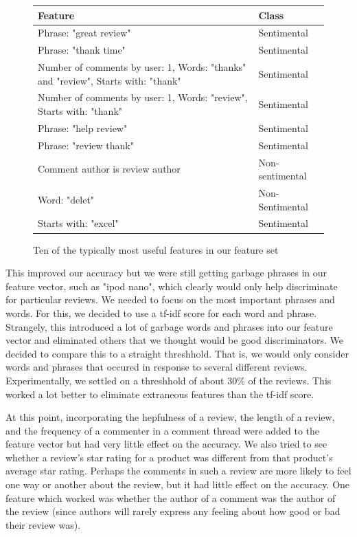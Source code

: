 \documentclass[]{report}
\begin{document}
\begin{figure}
	\begin{center}
	\begin{tabular}{ p{7 cm} | p{3 cm} }
			Feature& 
			Class     \\
			\hline
			\hline
			Phrase: "great review" & Sentimental  \\
			\hline
			Phrase: "thank time" & Sentimental  \\
			\hline
			Number of comments by user: 1, Words: "thanks" and "review", Starts with: "thank" & Sentimental \\
			\hline
			Number of comments by user: 1, Words: "review", Starts with: "thank" & Sentimental \\
			\hline
			Phrase: "help review" & Sentimental  \\
			\hline
			Phrase: "review thank" & Sentimental  \\
			\hline
			Comment author is review author & Non-sentimental  \\
			\hline
			Word: "delet" & Non-Sentimental  \\
			\hline
			Starts with: "excel" & Sentimental  \\
			\hline
		\end{tabular}
	\end{center}
	\caption{Ten of the typically most useful features in our feature set}
	\label{figBestFeatures}
\end{figure}


This improved our accuracy but we were still getting garbage phrases in our feature vector, such as "ipod nano", which clearly would only help discriminate for particular reviews.  We needed to focus on the most important phrases and words.  For this, we decided to use a tf-idf score for each word and phrase.  Strangely, this introduced a lot of garbage words and phrases into our feature vector and eliminated others that we thought would be good discriminators.  We decided to compare this to a straight threshhold.  That is, we would only consider words and phrases that occured in response to several different reviews.  Experimentally, we settled on a threshhold of about 30\% of the reviews.  This worked a lot better to eliminate extraneous features than the tf-idf score.

At this point, incorporating the hepfulness of a review, the length of a review, and the frequency of a commenter in a comment thread were added to the feature vector but had very little effect on the accuracy.  We also tried to see whether a review's star rating for a product was different from that product's average star rating.  Perhaps the comments in such a review are more likely to feel one way or another about the review, but it had little effect on the accuracy. One feature which worked was whether the author of a comment was the author of the review (since authors will rarely express any feeling about how good or bad their review was).
\end{document}
